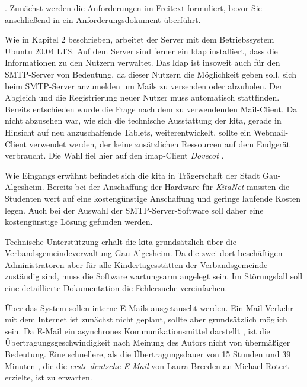  \citep[][454]{Balzert2010}.
Zunächst werden die Anforderungen im Freitext formuliert, bevor Sie anschließend in ein Anforderungsdokument überführt.  

Wie in Kapitel 2 beschrieben, arbeitet der Server mit dem Betriebssystem Ubuntu 20.04 LTS. Auf dem Server sind ferner ein \ac{ldap} installiert, dass die Informationen zu den Nutzern verwaltet. Das \ac{ldap} ist insoweit auch für den SMTP-Server von Bedeutung, da dieser Nutzern die Möglichkeit geben soll, sich beim SMTP-Server anzumelden um Mails zu versenden oder abzuholen. Der Abgleich und die Registrierung neuer Nutzer muss automatisch stattfinden.
Bereits entschieden wurde die Frage nach dem zu verwendenden Mail-Client. 
Da nicht abzusehen war, wie sich die technische Ausstattung der \ac{kita}, gerade in Hinsicht auf neu anzuschaffende Tablets, weiterentwickelt, sollte ein Webmail-Client verwendet werden, der keine zusätzlichen Ressourcen auf dem Endgerät verbraucht. Die Wahl fiel hier auf den \ac{imap}-Client \textit{Dovecot} \citep[vgl.][]{dovecotmain}. 

Wie Eingangs erwähnt befindet sich die \ac{kita} in Trägerschaft der Stadt Gau-Algesheim. Bereits bei der Anschaffung der Hardware für \textit{KitaNet} mussten die Studenten wert auf eine kostengünstige Anschaffung und geringe laufende Kosten legen. Auch bei der Auswahl der SMTP-Server-Software soll daher eine kostengünstige Lösung gefunden werden.

Technische Unterstützung erhält die  \ac{kita} grundsätzlich über die Verbandsgemeindeverwaltung Gau-Algesheim. Da die zwei dort beschäftigen Administratoren aber für alle Kindertagesstätten der Verbandsgemeinde zuständig sind, muss die Software wartungsarm angelegt sein. Im Störungsfall soll eine detaillierte Dokumentation die Fehlersuche vereinfachen.

Über das System sollen interne E-Mails ausgetauscht werden. Ein Mail-Verkehr mit dem Internet ist zunächst nicht geplant, sollte aber grundsätzlich möglich sein.
Da E-Mail ein asynchrones Kommunikationsmittel darstellt \citep[vgl.][10]{Duerscheid2003}, ist die Übertragungsgeschwindigkeit nach Meinung des Autors nicht von übermäßiger Bedeutung. Eine schnellere, als die Übertragungsdauer von 15 Stunden und 39 Minuten \citep[vgl.][]{maildauer}, die die \textit{erste deutsche E-Mail} von Laura Breeden an Michael Rotert erzielte, ist zu erwarten.

